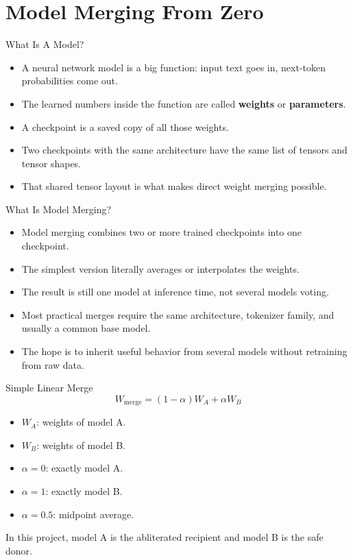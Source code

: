\documentclass[aspectratio=169]{beamer}
\begin{document}
\section{Model Merging From Zero}

\begin{frame}{What Is A Model?}
\small
\begin{itemize}
  \item A neural network model is a big function: input text goes in, next-token probabilities come out.
  \item The learned numbers inside the function are called \textbf{weights} or \textbf{parameters}.
  \item A checkpoint is a saved copy of all those weights.
  \item Two checkpoints with the same architecture have the same list of tensors and tensor shapes.
  \item That shared tensor layout is what makes direct weight merging possible.
\end{itemize}
\end{frame}

\begin{frame}{What Is Model Merging?}
\small
\begin{itemize}
  \item Model merging combines two or more trained checkpoints into one checkpoint.
  \item The simplest version literally averages or interpolates the weights.
  \item The result is still one model at inference time, not several models voting.
  \item Most practical merges require the same architecture, tokenizer family, and usually a common base model.
  \item The hope is to inherit useful behavior from several models without retraining from raw data.
\end{itemize}
\end{frame}

\begin{frame}{Simple Linear Merge}
\small
\[
W_{\mathrm{merge}}=(1-\alpha)W_A+\alpha W_B
\]
\begin{itemize}
  \item \(W_A\): weights of model A.
  \item \(W_B\): weights of model B.
  \item \(\alpha=0\): exactly model A.
  \item \(\alpha=1\): exactly model B.
  \item \(\alpha=0.5\): midpoint average.
\end{itemize}
In this project, model A is the abliterated recipient and model B is the safe donor.

\end{frame}
\end{document}
